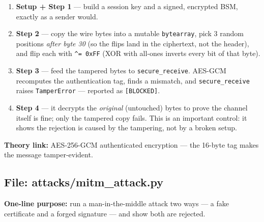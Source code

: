 \documentclass[11pt,a4paper]{article}
\begin{document}
\begin{enumerate}
  \item \textbf{Setup + Step 1} --- build a session key and a signed, encrypted
        BSM, exactly as a sender would.
  \item \textbf{Step 2} --- copy the wire bytes into a mutable \texttt{bytearray},
        pick 3 random positions \emph{after byte 30} (so the flips land in the
        ciphertext, not the header), and flip each with \texttt{\^{}= 0xFF} (XOR
        with all-ones inverts every bit of that byte).
  \item \textbf{Step 3} --- feed the tampered bytes to \texttt{secure\_receive}.
        AES-GCM recomputes the authentication tag, finds a mismatch, and
        \texttt{secure\_receive} raises \texttt{TamperError} --- reported as
        \texttt{[BLOCKED]}.
  \item \textbf{Step 4} --- it decrypts the \emph{original} (untouched) bytes to
        prove the channel itself is fine; only the tampered copy fails. This is
        an important control: it shows the rejection is caused by the tampering,
        not by a broken setup.
\end{enumerate}
\textbf{Theory link:} AES-256-GCM authenticated encryption --- the 16-byte tag
makes the message tamper-evident.

\subsection{File: attacks/mitm\_attack.py}
\textbf{One-line purpose:} run a man-in-the-middle attack two ways --- a fake
certificate and a forged signature --- and show both are rejected.
\end{document}
